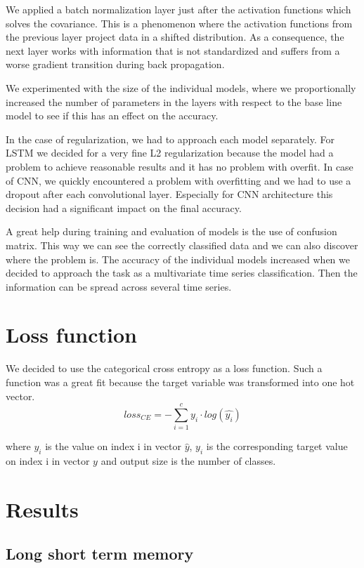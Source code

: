\documentclass[thesis=M,english]{FITthesis}[2019/12/23]
\begin{document}
We applied a batch normalization layer just after the activation functions which solves the covariance. This is a phenomenon where the activation functions from the previous layer project data in a shifted distribution. As a consequence, the next layer works with information that is not standardized and suffers from a worse \cite{batch_normalization} gradient transition during back propagation.

We experimented with the size of the individual models, where we proportionally increased the number of parameters in the layers with respect to the base line model to see if this has an effect on the accuracy.

In the case of regularization, we had to approach each model separately. For LSTM we decided for a very fine L2 regularization because the model had a problem to achieve reasonable results and it has no problem with overfit. In case of CNN, we quickly encountered a problem with overfitting and we had to use a dropout after each convolutional layer. Especially for CNN architecture this decision had a significant impact on the final accuracy.

A great help during training and evaluation of models is the use of confusion matrix. This way we can see the correctly classified data and we can also discover where the problem is.
The accuracy of the individual models increased when we decided to approach the task as a multivariate time series classification.
Then the information can be spread across several time series.

\section{Loss function}
We decided to use the categorical cross entropy as a loss function. Such a function was a great fit because the target variable was transformed into one hot vector.
\begin{equation*}
    loss_{CE} = - \sum_{i=1}^{c}y_i \cdot log (\hat{y_i})
\end{equation*}

where $\hat{y_i}$ is the value on index i in vector $\hat{y}$, 
$y_i$ is the corresponding target value on index i in vector $y$ and output size is the number of classes.
\newpage
\section{Results}
\subsection{Long short term memory}
\end{document}
